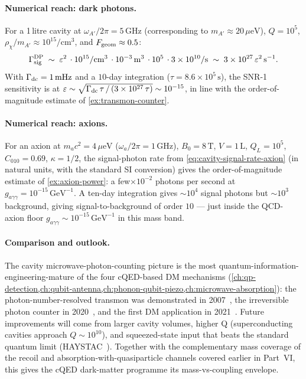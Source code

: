 \paragraph{Numerical reach: dark photons.}
For a 1\,litre cavity at $\omega_{A'}/2\pi=5\,\text{GHz}$
(corresponding to $m_{A'}\approx 20\,\mu\text{eV}$), $Q=10^5$,
$\rho_\chi/m_{A'}\approx 10^{15}/$cm$^3$, and
$F_{\rm geom}\approx 0.5$:
\begin{equation}
\Gamma_{\rm sig}^{\rm DP} \;\sim\; \varepsilon^2\,\cdot 10^{15}/\text{cm}^3\,\cdot
10^{-3}\,\text{m}^3\,\cdot 10^5\,\cdot 3\times 10^{10}/\text{s}
\;\sim\; 3\times 10^{27}\,\varepsilon^2\,\text{s}^{-1}.
\end{equation}
With $\Gamma_{\rm dc}=1\,\text{mHz}$ and a $10$-day integration
($\tau=8.6\times 10^5\,\text{s}$), the SNR-1 sensitivity is at
$\varepsilon\sim\sqrt{\Gamma_{\rm dc}\,\tau\,/\,(3\times 10^{27}\,\tau)}
\sim 10^{-15}$, in line with the order-of-magnitude estimate of
\cref{ex:transmon-counter}.

\paragraph{Numerical reach: axions.}
For an axion at $m_a c^2=4\,\mu\text{eV}$
($\omega_a/2\pi=1\,\text{GHz}$), $B_0=8\,\text{T}$, $V=1\,\text{L}$,
$Q_L=10^5$, $C_{010}=0.69$, $\kappa=1/2$, the signal-photon rate
from \cref{eq:cavity-signal-rate-axion} (in natural units, with
the standard SI conversion) gives the order-of-magnitude
estimate of \cref{ex:axion-power}: a few$\times 10^{-2}$ photons per
second at $g_{a\gamma\gamma}=10^{-15}\,\text{GeV}^{-1}$. A
ten-day integration gives $\sim 10^4$ signal photons but $\sim
10^3$ background, giving signal-to-background of order $10$ ---
just inside the QCD-axion floor $g_{a\gamma\gamma}\sim 10^{-15}\,\text{GeV}^{-1}$
in this mass band.

\paragraph{Comparison and outlook.}
The cavity microwave-photon-counting picture is the most
quantum-information-engineering-mature of the four cQED-based DM
mechanisms (\cref{ch:qp-detection,ch:qubit-antenna,ch:phonon-qubit-piezo,ch:microwave-absorption}):
the photon-number-resolved transmon was demonstrated in
2007~\cite{schuster2007}, the irreversible photon counter in
2020~\cite{lescanne2020}, and the first DM application in
2021~\cite{dixit2021}. Future improvements will come from larger
cavity volumes, higher Q (superconducting cavities approach
$Q\sim 10^{10}$), and squeezed-state input that beats the
standard quantum limit (HAYSTAC~\cite{haystac2021}). Together
with the complementary mass coverage of the recoil and
absorption-with-quasiparticle channels covered earlier in
Part~VI, this gives the cQED dark-matter programme its
mass-vs-coupling envelope.
